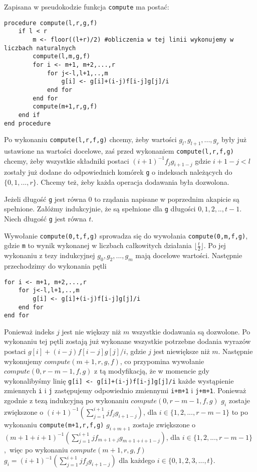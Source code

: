 \documentclass{article}
\begin{document}
Zapisana w pseudokodzie funkcja \texttt{compute} ma postać:

\begin{lstlisting}
procedure compute(l,r,g,f)
    if l < r
        m <- floor((l+r)/2) #obliczenia w tej linii wykonujemy w liczbach naturalnych
        compute(l,m,g,f)
        for i <- m+1, m+2,...,r
            for j<-l,l+1,..,m
                g[i] <- g[i]+(i-j)f[i-j]g[j]/i
            end for
        end for
        compute(m+1,r,g,f)
    end if
end procedure
\end{lstlisting}

Po wykonaniu \texttt{compute(l,r,f,g)} chcemy, żeby wartości $g_l,g_{l+1},...,g_{r}$ były już ustawione na wartości docelowe, zaś
przed wykonaniem \texttt{compute(l,r,f,g)} chcemy, żeby wszystkie składniki postaci $(i+1)^{-1}f_jg_{i+1-j}$ gdzie $i+1-j<l$ zostały
już dodane do odpowiednich komórek \texttt{g} o indeksach należących do $\{0,1,...,r\}$. Chcemy też, żeby każda operacja dodawania
była dozwolona. 

Jeżeli długość \texttt{g} jest równa $0$ to rządania napisane w poprzednim akapicie są spełnione. 
Załóżmy indukcyjnie, że są spełnione dla \texttt{g} długości $0,1,2,..,t-1$. Niech długość \texttt{g} jest równa $t$.

Wywołanie \texttt{compute(0,t,f,g)} sprowadza się do wywołania \texttt{compute(0,m,f,g)}, gdzie \texttt{m} to wynik wykonanej w
liczbach całkowitych działania $\lfloor \frac{t}{2}\rfloor$. Po jej wykonaniu z tezy indukcyjnej $g_0,g_2,...,g_m$ mają docelowe
wartości. Następnie przechodzimy do wykonania pętli
\begin{lstlisting}
for i <- m+1, m+2,...,r
    for j<-l,l+1,..,m
        g[i] <- g[i]+(i-j)f[i-j]g[j]/i
    end for
end for
\end{lstlisting}

Ponieważ indeks $j$ jest nie większy niż $m$ wszystkie dodawania są dozwolone. 
Po wykonaniu tej pętli zostają już wykonane wszystkie
potrzebne dodania wyrazów postaci $g[i]+(i-j)f[i-j]g[j]/i$, gdzie $j$ jest niewiększe niż $m$. 
Następnie wykonujemy $compute(m+1,r,g,f)$, co przypomina wywołanie $compute(0,r-m-1,f,g)$ z tą modyfikacją, że w momencie 
gdy wykonalibyśmy linię \texttt{g[i] <- g[i]+(i-j)f[i-j]g[j]/i} każde wystąpienie
zmiennych \texttt{i} i \texttt{j} zastępujemy odpowiednio zmiennymi \texttt{i+m+1} i \texttt{j+m+1}. Ponieważ zgodnie z tezą
indukcyjną po wykonaniu \texttt{$compute(0,r-m-1,f,g)$}
$g_i$ zostaje zwiększone o $(i+1)^{-1}(\sum_{j=1}^{i+1}jf_jg_{i+1-j})$, dla $i \in \{1,2,...,r-m-1\}$ 
to po wykonaniu \texttt{compute(m+1,r,f,g)} $g_{i+m+1}$  zostaje zwiększone o $(m+1+i+1)^{-1}(\sum_{j=1}^{i+1}jf_{m+1+j}g_{m+1+i+1-j})$, 
dla $i \in \{1,2,...,r-m-1\}$, więc po wykonaniu $compute(m+1,r,g,f)$ $g_i=(i+1)^{-1}(\sum_{j=1}^{i+1}jf_jg_{i+1-j})$ dla każdego
$i \in \{0,1,2,3,...,t\}$. 
\end{document}
